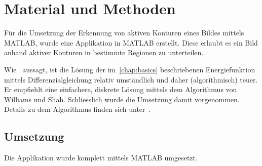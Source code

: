 \chapter{Material und Methoden}
\label{chap:realisation}


% 
% 
Für die Umsetzung der Erkennung von aktiven Konturen eines Bildes mittels MATLAB, wurde eine Applikation in MATLAB erstellt. Diese erlaubt es ein Bild anhand aktiver Konturen in bestimmte Regionen zu unterteilen.

Wie~\citet[S. 147]{hudritsch:script:cp} aussagt, ist die Lösung der im~\autoref{chap:basics} beschriebenen Energiefunktion mittels Differenzialgleichung relativ umständlich und daher (algorithmisch) teuer. Er empfiehlt eine einfachere, diskrete Lösung mittels dem Algorithmus von Williams und Shah. Schliesslich wurde die Umsetzung damit vorgenommen. Details zu dem Algorithmus finden sich unter~\cite[Seite 20]{williams92faa}.

\section{Umsetzung}
\label{sec:realization}
Die Applikation wurde komplett mittels MATLAB umgesetzt.

